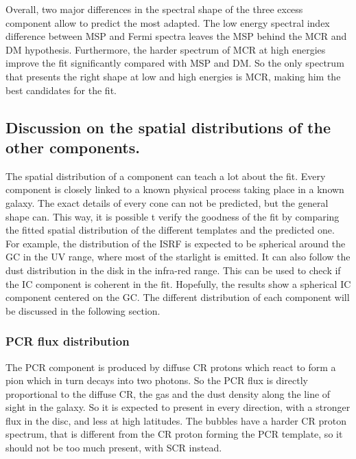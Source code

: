 Overall, two major differences in the spectral shape of the three excess component allow to predict the most adapted. The low energy spectral index difference between MSP and Fermi spectra leaves the MSP behind the MCR and DM hypothesis. Furthermore, the harder spectrum of MCR at high energies improve the fit significantly compared with MSP and DM. So the only spectrum that presents the right shape at low and high energies is MCR, making him the best candidates for the fit.


\subsection{Discussion on the spatial distributions of the other components.}

The spatial distribution of a component can teach a lot about the fit. Every component is closely linked to a known physical process taking place in a known galaxy. The exact details of every cone can not be predicted, but the general shape can. This way, it is possible t verify the goodness of the fit by comparing the fitted spatial distribution of the different templates and the predicted one.
For example, the distribution of the ISRF is expected to be spherical around the GC in the UV range, where most of the starlight is emitted. It can also follow the dust distribution in the disk in the infra-red range. This can be used to check if the IC component is coherent in the fit. Hopefully, the results show a spherical IC component centered on the GC.
The different distribution of each component will be discussed in the following section.

\subsubsection{PCR flux distribution}
The PCR component is produced by diffuse CR protons which react to form a pion which in turn decays into two photons. So the PCR flux is directly proportional to the diffuse CR, the gas and the dust density along the line of sight in the galaxy. So it is expected to present in every direction, with a stronger flux in the disc, and less at high latitudes. The bubbles have a harder CR proton spectrum, that is different from the CR proton forming the PCR template, so it should not be too much present, with SCR instead.

